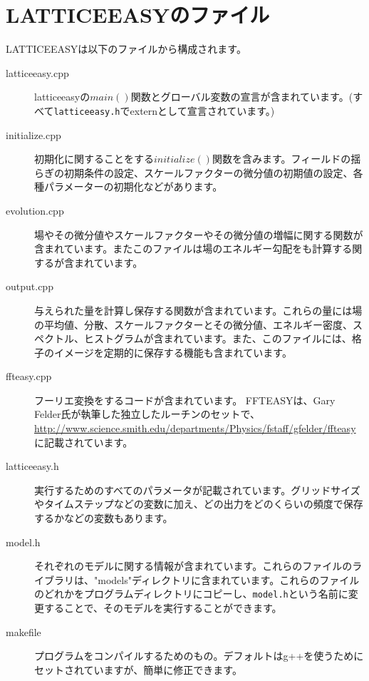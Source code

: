 \documentclass[dvipdfmx,11pt,a4paper,report]{jsbook}
\begin{document}
\chapter{LATTICEEASYのファイル}
LATTICEEASYは以下のファイルから構成されます。
\begin{description}
    \item[latticeeasy.cpp] latticeeasyの{\tt $main()$}関数とグローバル変数の宣言が含まれています。(すべて{\tt latticeeasy.h}でexternとして宣言されています。)
    \item[initialize.cpp] 初期化に関することをする{\tt $initialize()$}関数を含みます。フィールドの揺らぎの初期条件の設定、スケールファクターの微分値の初期値の設定、各種パラメーターの初期化などがあります。
    \item[evolution.cpp] 場やその微分値やスケールファクターやその微分値の増幅に関する関数が含まれています。またこのファイルは場のエネルギー勾配をも計算する関するが含まれています。
    \item[output.cpp] 与えられた量を計算し保存する関数が含まれています。これらの量には場の平均値、分散、スケールファクターとその微分値、エネルギー密度、スペクトル、ヒストグラムが含まれています。また、このファイルには、格子のイメージを定期的に保存する機能も含まれています。
    \item[ffteasy.cpp] フーリエ変換をするコードが含まれています。 FFTEASYは、Gary Felder氏が執筆した独立したルーチンのセットで、\url{http://www.science.smith.edu/departments/Physics/fstaff/gfelder/ffteasy}に記載されています。
    \item[latticeeasy.h] 実行するためのすべてのパラメータが記載されています。グリッドサイズやタイムステップなどの変数に加え、どの出力をどのくらいの頻度で保存するかなどの変数もあります。
    \item[model.h] それぞれのモデルに関する情報が含まれています。これらのファイルのライブラリは、"models"ディレクトリに含まれています。これらのファイルのどれかをプログラムディレクトリにコピーし、{\tt model.h}という名前に変更することで、そのモデルを実行することができます。
    \item[makefile] プログラムをコンパイルするためのもの。デフォルトはg++を使うためにセットされていますが、簡単に修正できます。
\end{description}



\end{document}
